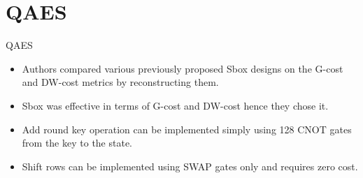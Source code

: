 \section{QAES}

\begin{frame}{QAES}
\begin{itemize}
    \item Authors compared various previously proposed Sbox designs on the G-cost and DW-cost metrics by reconstructing them.
    \pause
    \item \cite{aessbox} Sbox was effective in terms of G-cost and DW-cost hence they chose it.
    \begin{center}
    \pause
\begin{table}[h!]
    \centering
    \caption{Comparison of cost of sboxes}
    \label{tab:aessboxcost}
\end{table}
\end{center}
\pause
\item Add round key operation can be implemented simply using 128 CNOT gates from the key to the state.
\pause
\item Shift rows can be implemented using SWAP gates only and requires zero cost.
\end{itemize}
\end{frame}
